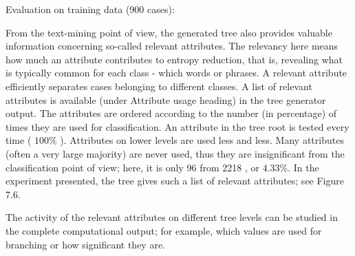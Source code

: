 Evaluation on training data (900 cases):


From the text-mining point of view, the generated tree also provides valuable information concerning so-called relevant attributes. The relevancy here means how much an attribute contributes to entropy reduction, that is, revealing what is typically common for each class - which words or phrases. A relevant attribute efficiently separates cases belonging to different classes. A list of relevant attributes is available (under Attribute usage heading) in the tree generator output. The attributes are ordered according to the number (in percentage) of times they are used for classification. An attribute in the tree root is tested every time ( $100 \%$ ). Attributes on lower levels are used less and less. Many attributes (often a very large majority) are never used, thus they are insignificant from the classification point of view; here, it is only 96 from 2218 , or $4.33 \%$. In the experiment presented, the tree gives such a list of relevant attributes; see Figure 7.6.

The activity of the relevant attributes on different tree levels can be studied in the complete computational output; for example, which values are used for branching or how significant they are.

